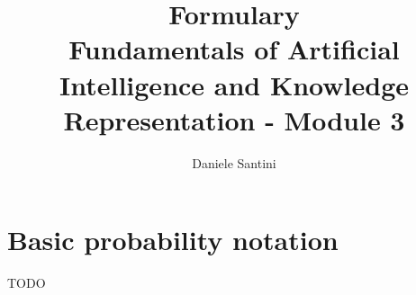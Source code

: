 \documentclass[]{article}
\title{Formulary \\ \large Fundamentals of Artificial Intelligence and Knowledge Representation - Module 3}
\author{Daniele Santini}
\begin{document}

\section{Basic probability notation}

TODO
\end{document}
